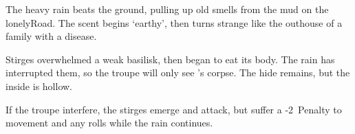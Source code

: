 \begin{boxtext}
  The heavy rain beats the ground, pulling up old smells from the mud on the
  \gls{lonelyRoad}.  The scent begins `earthy', then turns strange like the
  outhouse of a family with a disease.
\end{boxtext}

Stirges overwhelmed a weak \gls{basilisk}, then began to eat its body.  The
rain has interrupted them, so the troupe will only see 's
corpse.  The hide remains, but the inside is hollow.

If the troupe interfere, the stirges emerge and attack, but suffer a -2~Penalty
to movement and any rolls while the rain continues.

\stirgeSwarm
